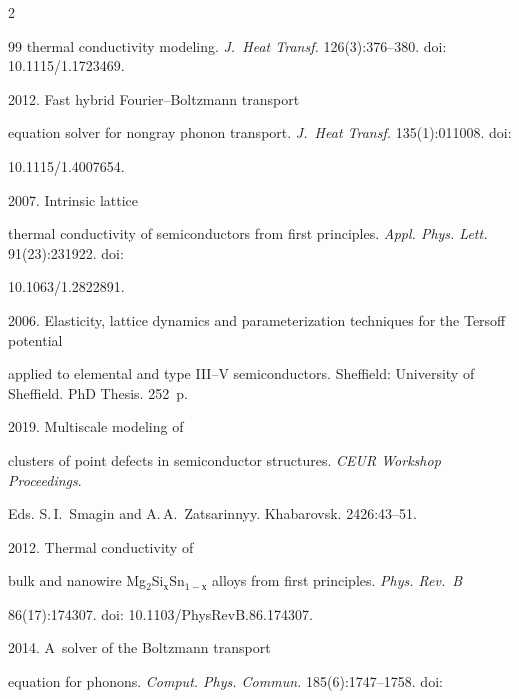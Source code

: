 \begin{multicols}{2}
{{\begin{thebibliography}{99}
thermal conductivity modeling. \textit{J.~Heat Transf.} 126(3):376--380. doi: 10.1115/1.1723469.







   2012. Fast hybrid Fourier--Boltzmann transport 


equation solver for nongray phonon transport. \textit{J.~Heat Transf.} 135(1):011008. doi: 


10.1115/1.4007654.







   2007. Intrinsic lattice 


thermal conductivity of semiconductors from first principles. \textit{Appl. Phys. Lett.} 91(23):231922. doi: 


10.1063/1.2822891. 




   2006. Elasticity, lattice dynamics and parameterization techniques for the Tersoff potential 


applied to elemental and type III--V semiconductors. Sheffield: University of Sheffield. PhD Thesis. 252~p.




 2019. Multiscale modeling of 


clusters of point defects in semiconductor structures. \textit{CEUR Workshop Proceedings}.  


Eds. S.\,I.~Smagin and A.\,A.~Zatsarinnyy. Khabarovsk. 2426:43--51.




   2012. Thermal conductivity of 


bulk and nanowire Mg$_2$Si$_х$Sn$_{1-х}$ alloys from first principles. \textit{Phys. Rev.~B} 


86(17):174307. doi: 10.1103/PhysRevB.86.174307.




   2014. A~solver of the Boltzmann transport 


equation for phonons. \textit{Comput. Phys. Commun.} 185(6):1747--1758. doi: 



\end{thebibliography}}}
\end{multicols}
